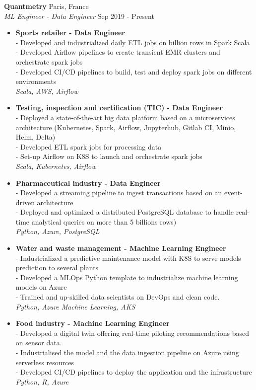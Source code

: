 \documentclass[a4paper]{article}
\begin{document}
\textbf{Quantmetry} \hfill Paris, France\\
\textit{ML Engineer - Data Engineer} \hfill Sep 2019 - Present\\
\vspace{-1mm}
\begin{itemize} \itemsep 1pt
	\item{\bf Sports retailer - Data Engineer}\\
	- Developed and industrialized daily ETL jobs on billion rows in Spark Scala \\
    - Developed Airflow pipelines to create transient EMR clusters and orchestrate spark jobs\\
    - Developed CI/CD pipelines to build, test and deploy spark jobs on different environments \\
    {\sl Scala, AWS, Airflow}\\
	\item {\bf Testing, inspection and certification (TIC) - Data Engineer} \\
	-  Deployed a state-of-the-art big data platform based on a microservices architecture (Kubernetes, Spark, Airflow, Jupyterhub, Gitlab CI, Minio, Helm, Delta) \\
    - Developed ETL spark jobs for processing data \\
    - Set-up Airflow on K8S to launch and orchestrate spark jobs \\
    {\sl Scala, Kubernetes, Airflow}\\
    \item {\bf Pharmaceutical industry - Data Engineer} \\
    - Developed a streaming pipeline to ingest transactions based on an event-driven architecture \\
    - Deployed and optimized a distributed PostgreSQL database to handle real-time analytical queries on more than 5 billions rows)\\
    {\sl Python, Azure, PostgreSQL}\\
    \item {\bf Water and waste management - Machine Learning Engineer} \\
    - Industrialized a predictive maintenance model with K8S to serve models prediction to several plants  \\
    - Developed a MLOps Python template to industrialize machine learning models on Azure  \\
    - Trained and up-skilled data scientists on DevOps and clean code.  \\
    {\sl Python, Azure Machine Learning, AKS}\\
    \item {\bf Food industry - Machine Learning Engineer} \\
    - Developed a digital twin offering real-time piloting recommendations based on sensor data. \\
    - Industrialised the model and the data ingestion pipeline on Azure using serverless resources  \\
    - Developed CI/CD pipelines to deploy the application and the infrastructure \\
    {\sl Python, R, Azure}
\end{itemize}
\end{document}
